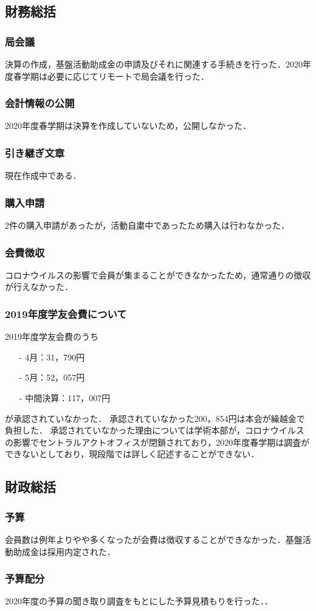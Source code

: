 \subsection*{財務総括}


\subsubsection*{局会議}
決算の作成，基盤活動助成金の申請及びそれに関連する手続きを行った．2020年度春学期は必要に応じてリモートで局会議を行った．

\subsubsection*{会計情報の公開}
2020年度春学期は決算を作成していないため，公開しなかった．

\subsubsection*{引き継ぎ文章}
現在作成中である．

\subsubsection*{購入申請}
2件の購入申請があったが，活動自粛中であったため購入は行わなかった．

\subsubsection*{会費徴収}
コロナウイルスの影響で会員が集まることができなかったため，通常通りの徴収が行えなかった．

\subsubsection*{2019年度学友会費について}
2019年度学友会費のうち
\begin{itemize}
	\item[-]4月：31，790円
	\item[-]5月：52，057円
	\item[-]中間決算：117，007円
\end{itemize}
が承認されていなかった．
承認されていなかった200，854円は本会が繰越金で負担した．
承認されていなかった理由については学術本部が，コロナウイルスの影響でセントラルアクトオフィスが閉鎖されており，2020年度春学期は調査ができないとしており，現段階では詳しく記述することができない．


\subsection*{財政総括}


\subsubsection*{予算}
会員数は例年よりやや多くなったが会費は徴収することができなかった．基盤活動助成金は採用内定された．

\subsubsection*{予算配分}
2020年度の予算の聞き取り調査をもとにした予算見積もりを行った．．
